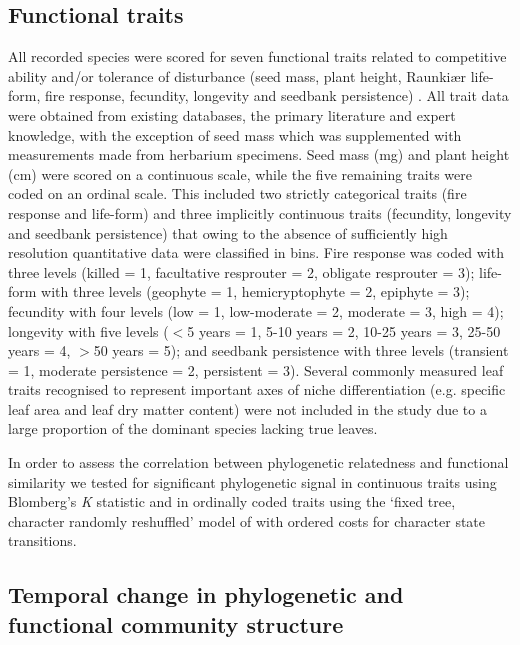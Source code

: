 \subsection{Functional traits}

All recorded species were scored for seven functional traits related to competitive ability and/or tolerance of disturbance (seed mass, plant height, Raunki\ae r life-form, fire response, fecundity, longevity and seedbank persistence) \citep{Westoby2002, Adler2013a}. All trait data were obtained from existing databases, the primary literature and expert knowledge, with the exception of seed mass which was supplemented with measurements made from herbarium specimens. Seed mass (mg) and plant height (cm) were scored on a continuous scale, while the five remaining traits were coded on an ordinal scale. This included two strictly categorical traits (fire response and life-form) and three implicitly continuous traits (fecundity, longevity and seedbank persistence) that owing to the absence of sufficiently high resolution quantitative data were classified in bins. Fire response was coded with three levels (killed = 1, facultative resprouter = 2, obligate resprouter = 3); life-form with three levels (geophyte = 1, hemicryptophyte = 2, epiphyte = 3); fecundity with four levels (low = 1, low-moderate = 2, moderate = 3, high = 4); longevity with five levels ($<$5 years = 1, 5-10 years = 2,  10-25 years = 3, 25-50 years = 4, $>$50 years = 5); and seedbank persistence with three levels (transient = 1, moderate persistence = 2, persistent = 3). Several commonly measured leaf traits recognised to represent important axes of niche differentiation (e.g. specific leaf area and leaf dry matter content) were not included in the study due to a large proportion of the dominant species lacking true leaves.

In order to assess the correlation between phylogenetic relatedness and functional similarity we tested for significant phylogenetic signal in continuous traits using Blomberg's \textit{K} statistic \citep{Blomberg2003} and in ordinally coded traits using the `fixed tree, character randomly reshuffled' model of \citet{Maddison1991} with ordered costs for character state transitions.

\subsection{Temporal change in phylogenetic and functional community structure}

